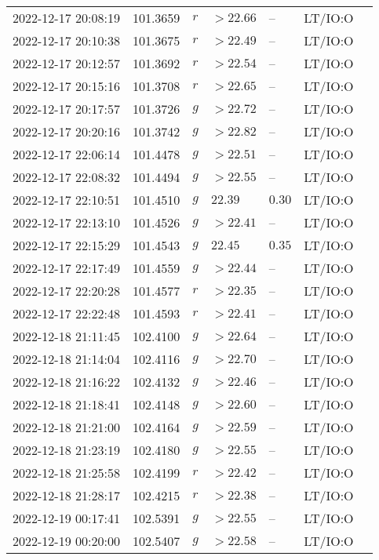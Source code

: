 \documentclass{nature_plusfigure}
\begin{document}
\begin{supplement}
\begin{center}
\begin{longtable}{lllllll}
2022-12-17 20:08:19 & 101.3659 & $r$ & $>22.66$ & -- & LT/IO:O &  \\ 
2022-12-17 20:10:38 & 101.3675 & $r$ & $>22.49$ & -- & LT/IO:O &  \\ 
2022-12-17 20:12:57 & 101.3692 & $r$ & $>22.54$ & -- & LT/IO:O &  \\ 
2022-12-17 20:15:16 & 101.3708 & $r$ & $>22.65$ & -- & LT/IO:O &  \\ 
2022-12-17 20:17:57 & 101.3726 & $g$ & $>22.72$ & -- & LT/IO:O &  \\ 
2022-12-17 20:20:16 & 101.3742 & $g$ & $>22.82$ & -- & LT/IO:O &  \\ 
2022-12-17 22:06:14 & 101.4478 & $g$ & $>22.51$ & -- & LT/IO:O &  \\ 
2022-12-17 22:08:32 & 101.4494 & $g$ & $>22.55$ & -- & LT/IO:O &  \\ 
2022-12-17 22:10:51 & 101.4510 & $g$ & $22.39$ & $0.30$ & LT/IO:O &  \\ 
2022-12-17 22:13:10 & 101.4526 & $g$ & $>22.41$ & -- & LT/IO:O &  \\ 
2022-12-17 22:15:29 & 101.4543 & $g$ & $22.45$ & $0.35$ & LT/IO:O &  \\ 
2022-12-17 22:17:49 & 101.4559 & $g$ & $>22.44$ & -- & LT/IO:O &  \\ 
2022-12-17 22:20:28 & 101.4577 & $r$ & $>22.35$ & -- & LT/IO:O &  \\ 
2022-12-17 22:22:48 & 101.4593 & $r$ & $>22.41$ & -- & LT/IO:O &  \\ 
2022-12-18 21:11:45 & 102.4100 & $g$ & $>22.64$ & -- & LT/IO:O &  \\ 
2022-12-18 21:14:04 & 102.4116 & $g$ & $>22.70$ & -- & LT/IO:O &  \\ 
2022-12-18 21:16:22 & 102.4132 & $g$ & $>22.46$ & -- & LT/IO:O &  \\ 
2022-12-18 21:18:41 & 102.4148 & $g$ & $>22.60$ & -- & LT/IO:O &  \\ 
2022-12-18 21:21:00 & 102.4164 & $g$ & $>22.59$ & -- & LT/IO:O &  \\ 
2022-12-18 21:23:19 & 102.4180 & $g$ & $>22.55$ & -- & LT/IO:O &  \\ 
2022-12-18 21:25:58 & 102.4199 & $r$ & $>22.42$ & -- & LT/IO:O &  \\ 
2022-12-18 21:28:17 & 102.4215 & $r$ & $>22.38$ & -- & LT/IO:O &  \\ 
2022-12-19 00:17:41 & 102.5391 & $g$ & $>22.55$ & -- & LT/IO:O &  \\ 
2022-12-19 00:20:00 & 102.5407 & $g$ & $>22.58$ & -- & LT/IO:O &  \\ 

\end{longtable}
\end{center}
\end{supplement}
\end{document}

